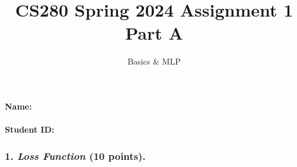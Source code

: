 \documentclass[12pt]{article}%
\begin{document}
\title{CS280 Spring 2024 Assignment 1 \\ Part A}
\author{Basics \& MLP}
\maketitle

\paragraph{Name:}

\paragraph{Student ID:}

\newpage

\subsubsection*{1. \textit{Loss Function} (10 points).}
\end{document}
